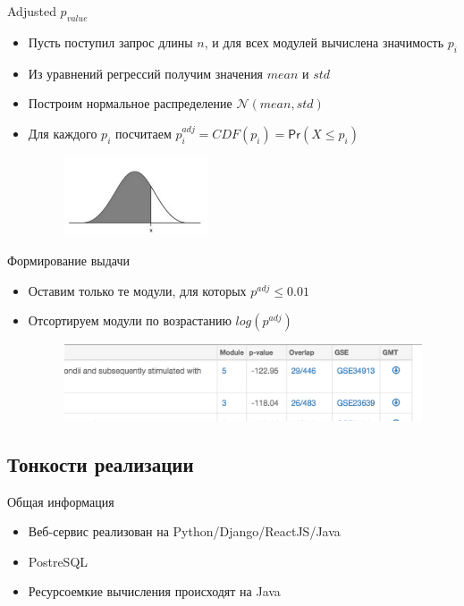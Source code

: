 \documentclass[10pt,pdf,utf8,russian,aspectratio=169]{beamer}
\begin{document}
\begin{frame}{Adjusted $p_{value}$}
  \begin{itemize}[<+->]
    \item Пусть поступил запрос длины $n$, и для всех модулей вычислена значимость $p_i$
    \item Из уравнений регрессий получим значения $mean$ и $std$
    \item Построим нормальное распределение $\mathcal{N}(mean, std)$
    \item Для каждого $p_i$ посчитаем $p^{adj}_i = CDF(p_i) = \mathsf{Pr}(X \le p_i)$ 
        \begin{figure}[!ht]
        \centering
        \includegraphics[width=0.4\textwidth]{./img/bell.png}
    \end{figure}
  \end{itemize}
\end{frame}

\begin{frame}{Формирование выдачи}
  \begin{itemize}[<+->]
    \item Оставим только те модули, для которых $p^{adj} \le 0.01$
    \item Отсортируем модули по возрастанию $log(p^{adj})$
        \begin{figure}[!ht]
            \centering
            \includegraphics[width=\textwidth]{./img/screen_p_value.png}
        \end{figure}
  \end{itemize}
\end{frame}

\subsection{Тонкости реализации}

\begin{frame}{Общая информация}
  \begin{itemize}[<+->]
    \item Веб-сервис реализован на Python/Django/ReactJS/Java
    \item PostreSQL
    \item Ресурсоемкие вычисления происходят на Java
  \end{itemize}
\end{frame}
\end{document}
